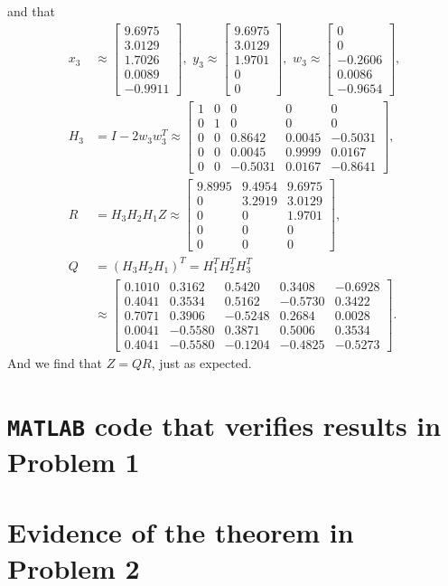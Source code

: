 \documentclass[11pt]{article}
\begin{document}
and that 
\begin{equation}\begin{split} 
x_3 &\approx
\begin{bmatrix} 9.6975 \\ 3.0129 \\ 1.7026 \\ 0.0089 \\ -0.9911\end{bmatrix},\,\,
y_3 \approx \begin{bmatrix} 
9.6975 \\ 3.0129 \\ 1.9701 \\ 0 \\ 0
\end{bmatrix},\,\,
w_3 \approx \begin{bmatrix} 0 \\ 0 \\ -0.2606 \\ 0.0086 \\ -0.9654\end{bmatrix}, \\
H_3 &= I - 2w_3w_3^T \approx 
\begin{bmatrix} 
1 & 0 & 0 & 0 & 0\\
0 & 1 & 0 & 0 & 0 \\
0 & 0 & 0.8642 & 0.0045 & -0.5031 \\
0 & 0 & 0.0045 & 0.9999 & 0.0167 \\
0 & 0 & -0.5031 & 0.0167 & -0.8641
\end{bmatrix},\\
R &= H_3H_2 H_1Z \approx
\begin{bmatrix} 
9.8995 & 9.4954 & 9.6975 \\
0 & 3.2919 & 3.0129 \\
0 & 0 & 1.9701 \\
0 & 0 & 0\\
0 & 0 & 0
\end{bmatrix},\\
Q &= (H_3H_2H_1)^T = H_1^TH_2^TH_3^T\\
&\approx
\begin{bmatrix} 
0.1010 & 0.3162 & 0.5420 & 0.3408 & -0.6928 \\
0.4041 & 0.3534 & 0.5162 & -0.5730 & 0.3422\\
0.7071 & 0.3906 & -0.5248 & 0.2684 & 0.0028\\
0.0041 & -0.5580 & 0.3871 & 0.5006 & 0.3534\\
0.4041 & -0.5580 & -0.1204 & -0.4825 & -0.5273
\end{bmatrix}.
\end{split}\nonumber\end{equation} 
And we find that $Z = QR$, just as expected.

\newpage
\appendix{}
\section{\texttt{MATLAB} code that verifies results in Problem 1}

\section{Evidence of the theorem in Problem 2}
\end{document}
